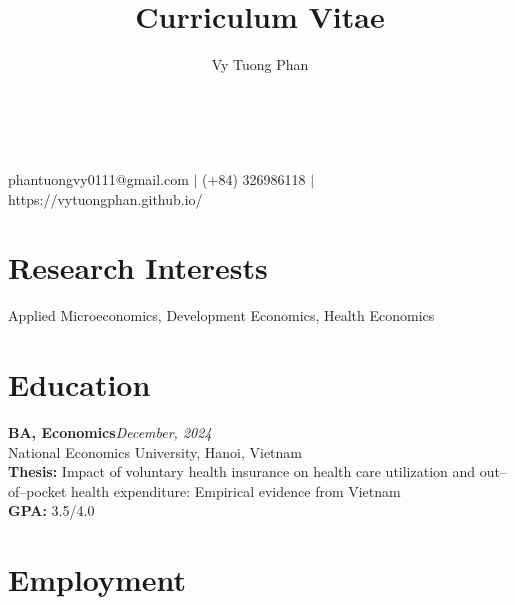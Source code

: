 \documentclass[10.5pt]{article}
\makeatletter
\newcommand{\cvcolor}{\color{DodgerBlue4}} %
\renewcommand{\maketitle}{
\begin{center}
{\Huge\theauthor}\\
\vspace{0.5em}
{\Large \cvcolor{Curriculum Vitae}}\\
{\color{Gray}phantuongvy0111@gmail.com $|$ (+84) 326986118 $|$ https://vytuongphan.github.io/}
\end{center}
}
\makeatother
\begin{document}
\title{Curriculum Vitae} %
\author{Vy Tuong Phan}

\maketitle


\section{Research Interests}
Applied Microeconomics, Development Economics, Health Economics


\section{Education}

\textbf{BA, Economics}\hfill\emph{December, 2024}\\
National Economics University, Hanoi, Vietnam \\
\textbf{Thesis:} Impact of voluntary health insurance on health care utilization and out–of–pocket health expenditure: Empirical evidence from Vietnam \\
\textbf{GPA:} 3.5/4.0




\section{Employment}
\end{document}
